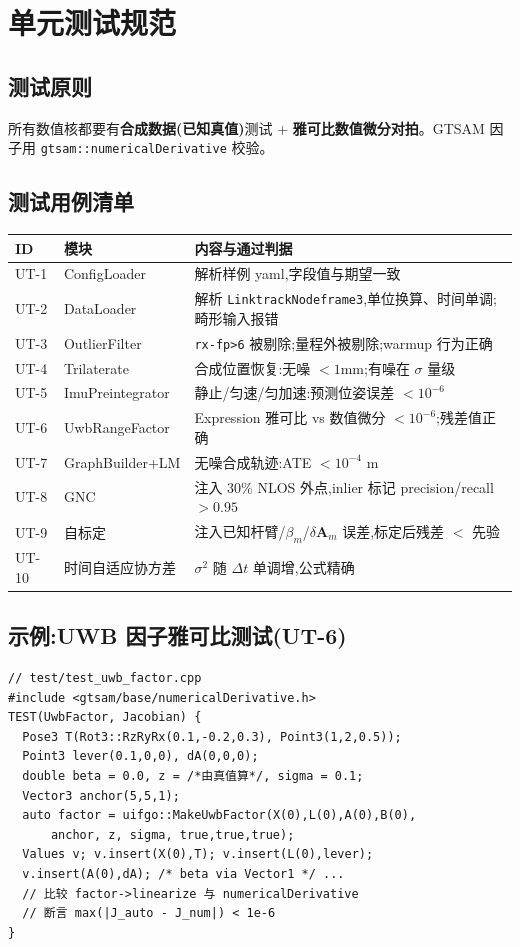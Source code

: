 \documentclass[11pt,a4paper]{report}
\newcommand{\bA}{\bm{A}}
\begin{document}
\chapter{单元测试规范}\label{sec:ut}

\section{测试原则}
所有数值核都要有\textbf{合成数据(已知真值)}测试 + \textbf{雅可比数值微分对拍}。GTSAM 因子用 \texttt{gtsam::numericalDerivative} 校验。

\section{测试用例清单}
\begin{longtable}{l p{4.2cm} p{6.0cm}}
\toprule
ID & 模块 & 内容与通过判据 \\
\midrule
UT-1 & ConfigLoader & 解析样例 yaml,字段值与期望一致 \\
UT-2 & DataLoader & 解析 \texttt{LinktrackNodeframe3},单位换算、时间单调;畸形输入报错 \\
UT-3 & OutlierFilter & \texttt{rx-fp>6} 被剔除;量程外被剔除;warmup 行为正确 \\
UT-4 & Trilaterate & 合成位置恢复:无噪 $<1$mm;有噪在 $\sigma$ 量级 \\
UT-5 & ImuPreintegrator & 静止/匀速/匀加速:预测位姿误差 $<10^{-6}$ \\
UT-6 & UwbRangeFactor & Expression 雅可比 vs 数值微分 $<10^{-6}$;残差值正确 \\
UT-7 & GraphBuilder+LM & 无噪合成轨迹:ATE $<10^{-4}$ m \\
UT-8 & GNC & 注入 30\% NLOS 外点,inlier 标记 precision/recall $>0.95$ \\
UT-9 & 自标定 & 注入已知杆臂/$\beta_m$/$\delta\bA_m$ 误差,标定后残差 $<$ 先验 \\
UT-10 & 时间自适应协方差 & $\sigma^2$ 随 $\Delta t$ 单调增,公式精确 \\
\bottomrule
\end{longtable}

\section{示例:UWB 因子雅可比测试(UT-6)}
\begin{lstlisting}[style=cpp]
// test/test_uwb_factor.cpp
#include <gtsam/base/numericalDerivative.h>
TEST(UwbFactor, Jacobian) {
  Pose3 T(Rot3::RzRyRx(0.1,-0.2,0.3), Point3(1,2,0.5));
  Point3 lever(0.1,0,0), dA(0,0,0);
  double beta = 0.0, z = /*由真值算*/, sigma = 0.1;
  Vector3 anchor(5,5,1);
  auto factor = uifgo::MakeUwbFactor(X(0),L(0),A(0),B(0),
      anchor, z, sigma, true,true,true);
  Values v; v.insert(X(0),T); v.insert(L(0),lever);
  v.insert(A(0),dA); /* beta via Vector1 */ ...
  // 比较 factor->linearize 与 numericalDerivative
  // 断言 max(|J_auto - J_num|) < 1e-6
}
\end{lstlisting}
\end{document}

